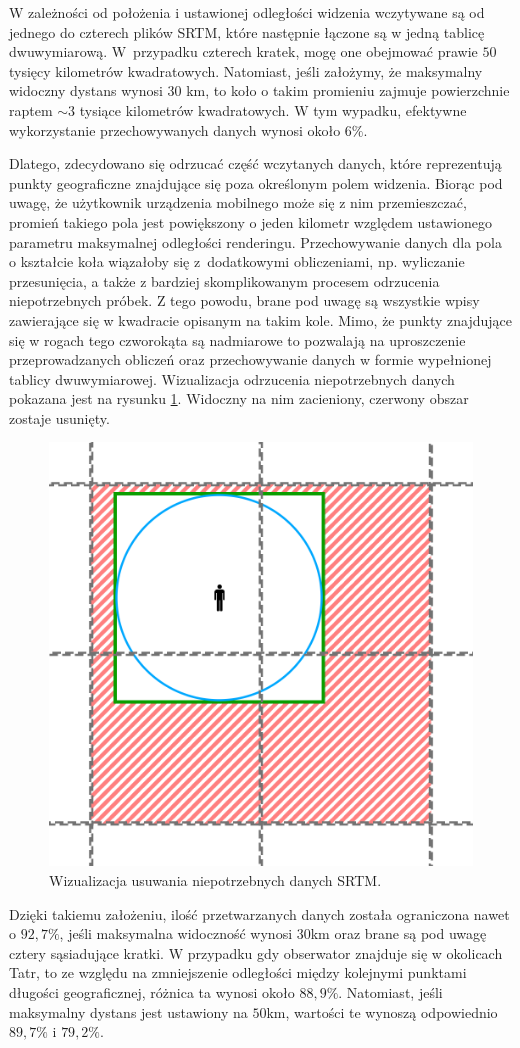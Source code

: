 W zależności od położenia i ustawionej odległości widzenia wczytywane są od jednego do czterech plików SRTM, które następnie łączone są w jedną tablicę dwuwymiarową. W~przypadku czterech kratek, mogę one obejmować prawie $50$ tysięcy kilometrów kwadratowych. Natomiast, jeśli założymy, że maksymalny widoczny dystans wynosi $30$ km, to koło o takim promieniu zajmuje powierzchnie raptem $\sim3$ tysiące kilometrów kwadratowych. W tym wypadku, efektywne wykorzystanie przechowywanych danych wynosi około $6\%$.

Dlatego, zdecydowano się odrzucać część wczytanych danych, które reprezentują punkty geograficzne znajdujące się poza określonym polem widzenia. Biorąc pod uwagę, że użytkownik urządzenia mobilnego może się z nim przemieszczać, promień takiego pola jest powiększony o jeden kilometr względem ustawionego parametru maksymalnej odległości renderingu. Przechowywanie danych dla pola o kształcie koła wiązałoby się z~dodatkowymi obliczeniami, np. wyliczanie przesunięcia, a także z bardziej skomplikowanym procesem odrzucenia niepotrzebnych próbek. Z tego powodu, brane pod uwagę są wszystkie wpisy zawierające się w kwadracie opisanym na takim kole. Mimo, że punkty znajdujące się w rogach tego czworokąta są nadmiarowe to pozwalają na uproszczenie przeprowadzanych obliczeń oraz przechowywanie danych w formie wypełnionej tablicy dwuwymiarowej. Wizualizacja odrzucenia niepotrzebnych danych pokazana jest na rysunku \ref{fig:drop-unused-data}. Widoczny na nim zacieniony, czerwony obszar zostaje usunięty.

\begin{figure}[!h]
    \centering \includegraphics[width=0.5\linewidth]{img/odrzucenie_srtm.png}
    \caption{Wizualizacja usuwania niepotrzebnych danych SRTM.}
    \label{fig:drop-unused-data}
\end{figure}

Dzięki takiemu założeniu, ilość przetwarzanych danych została ograniczona nawet o $92,7\%$, jeśli maksymalna widoczność wynosi $30$km oraz brane są pod uwagę cztery sąsiadujące kratki. W przypadku gdy obserwator znajduje się w okolicach Tatr, to ze względu na zmniejszenie odległości między kolejnymi punktami długości geograficznej, różnica ta wynosi około $88,9\%$. Natomiast, jeśli maksymalny dystans jest ustawiony na $50$km, wartości te wynoszą odpowiednio $89,7\%$ i $79,2\%$.

